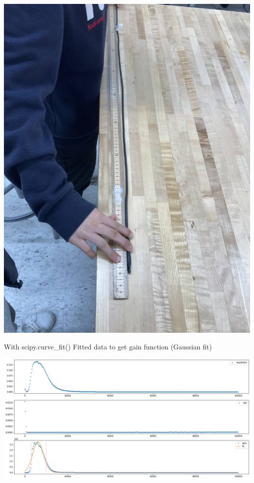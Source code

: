 \documentclass[a4paper]{tufte-handout}
\begin{document}
\includegraphics[angle=90,origin=c,width = 1 \textwidth]{figures/day3_cap.jpg}

With {scipy.curve\_fit()} Fitted data to get gain function (Gaussian fit)

\includegraphics[width = 1.5\textwidth]{figures/day3_gain.png}

\hrulefill
\end{document}
